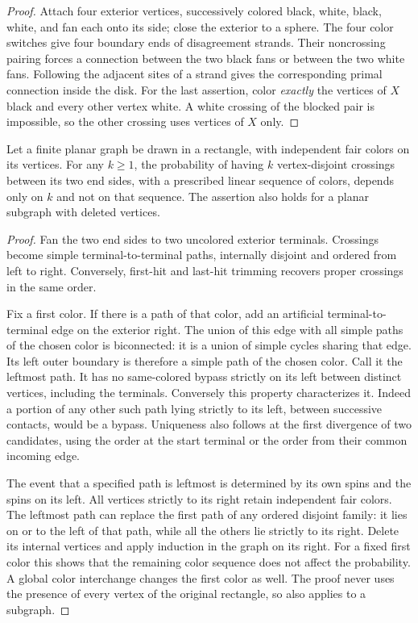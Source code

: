 \begin{proof}
Attach four exterior vertices, successively colored black, white, black,
white, and fan each onto its side; close the exterior to a sphere.  The
four color switches give four boundary ends of disagreement strands.
Their noncrossing pairing forces a connection between the two black fans
or between the two white fans.  Following the adjacent sites of a strand
gives the corresponding primal connection inside the disk.  For the last
assertion, color \emph{exactly} the vertices of $X$ black and every other
vertex white.  A white crossing of the blocked pair is impossible, so
the other crossing uses vertices of $X$ only.
\end{proof}

\begin{lemma}\label{prob:color-order}
Let a finite planar graph be drawn in a rectangle, with independent fair
colors on its vertices.  For any $k\ge1$, the probability of having $k$
vertex-disjoint crossings between its two end sides, with a prescribed
linear sequence of colors, depends only on $k$ and not on that sequence.
The assertion also holds for a planar subgraph with deleted vertices.
\end{lemma}

\begin{proof}
Fan the two end sides to two uncolored exterior terminals.  Crossings
become simple terminal-to-terminal paths, internally disjoint and ordered
from left to right.  Conversely, first-hit and last-hit trimming recovers
proper crossings in the same order.

Fix a first color.  If there is a path of that color, add an artificial
terminal-to-terminal edge on the exterior right.  The union of this edge
with all simple paths of the chosen color is biconnected: it is a union
of simple cycles sharing that edge.  Its left outer boundary is therefore
a simple path of the chosen color.  Call it the leftmost path.  It has
no same-colored bypass strictly on its left between distinct vertices,
including the terminals.  Conversely this property characterizes it.
Indeed a portion of any other such path lying strictly to its left,
between successive contacts, would be a bypass.  Uniqueness also follows
at the first divergence of two candidates, using the order at the start
terminal or the order from their common incoming edge.

The event that a specified path is leftmost is determined by its own
spins and the spins on its left.  All vertices strictly to its right
retain independent fair colors.  The leftmost path can replace the first
path of any ordered disjoint family: it lies on or to the left of that
path, while all the others lie strictly to its right.  Delete its internal
vertices and apply induction in the graph on its right.  For a fixed
first color this shows that the remaining color sequence does not affect
the probability.  A global color interchange changes the first color as
well.  The proof never uses the presence of every vertex of the original
rectangle, so also applies to a subgraph.
\end{proof}

